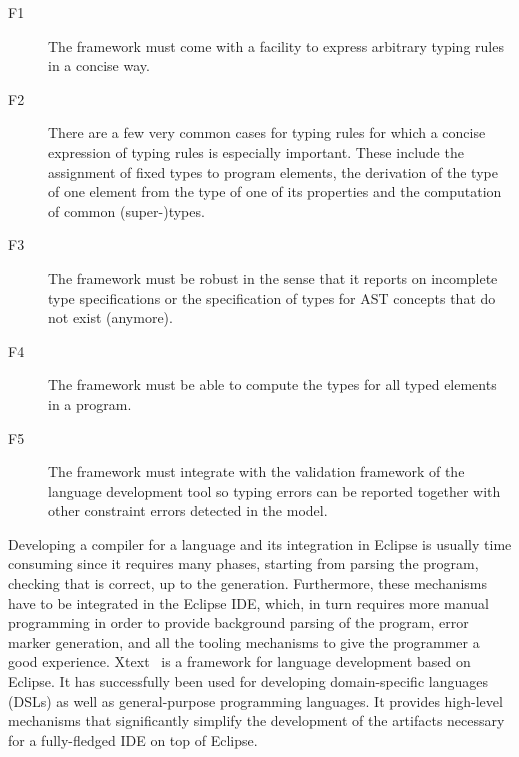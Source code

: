 \begin{description}
  \item[F1] The framework must come with a facility to express arbitrary typing
  rules in a concise way. 
  \item[F2] There are a few very common cases for typing rules for which a
  concise expression of typing rules is especially important. These include the 
  assignment of fixed types to program elements, the derivation of the type of one 
  element from the type of one of its properties and the computation of common (super-)types.
  \item[F3] The framework must be robust in the sense that it reports on
  incomplete type specifications or the specification of types for AST concepts
  that do not exist (anymore).
  \item[F4] The framework must be able to compute the types for all typed
  elements in a program. 
  \item[F5]  The framework must integrate with the validation framework of the
  language development tool so typing errors can be reported together with other
  constraint errors detected in the model.
\end{description}






Developing a compiler for a language  and its integration in Eclipse is
usually time consuming since it requires many phases, starting from parsing the
program, checking that is correct, up to the generation. Furthermore, these
mechanisms have to be integrated in the Eclipse IDE, which, in turn requires
more manual programming in order to provide background parsing of the program,
error marker generation, and all the tooling mechanisms to give the programmer a
good experience.  Xtext~\cite{xtext} is a
framework for language development based on Eclipse. It has successfully been
used for developing domain-specific languages (DSLs) as well as general-purpose
programming languages. It provides high-level mechanisms that significantly
simplify the development of the artifacts necessary for a fully-fledged IDE on
top of Eclipse.


